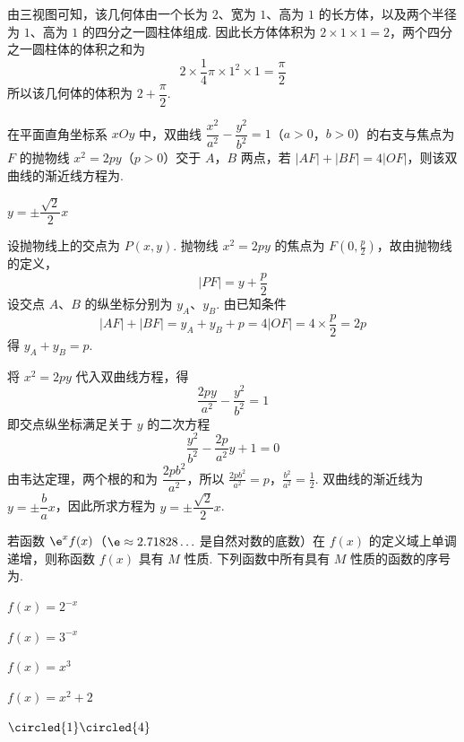 \begin{solution}
由三视图可知，该几何体由一个长为 \(2\)、宽为 \(1\)、高为 \(1\) 的长方体，以及两个半径为 \(1\)、高为 \(1\) 的四分之一圆柱体组成. 因此长方体体积为 \(2\times1\times1=2\)，两个四分之一圆柱体的体积之和为
\[
2\times\frac14\pi\times1^2\times1=\frac\pi2
\]
所以该几何体的体积为 \(2+\dfrac\pi2\).
\end{solution}

\begin{problem}
在平面直角坐标系 \(xOy\) 中，双曲线 \(\dfrac{x^2}{a^2}-\dfrac{y^2}{b^2}=1\)（\(a>0\)，\(b>0\)）的右支与焦点为 \(F\) 的抛物线 \(x^2=2py\)（\(p>0\)）交于 \(A\)，\(B\) 两点，若 \(\lvert AF\rvert+\lvert BF\rvert=4\lvert OF\rvert\)，则该双曲线的渐近线方程为\fillinblank{}.
\end{problem}

\begin{answer}
\(y=\pm\dfrac{\sqrt2}{2}x\)
\end{answer}

\begin{solution}
设抛物线上的交点为 \(P(x,y)\). 抛物线 \(x^2=2py\) 的焦点为 \(F(0,\frac p2)\)，故由抛物线的定义，
\[
|PF|=y+\frac p2
\]
设交点 \(A\)、\(B\) 的纵坐标分别为 \(y_A\)、\(y_B\). 由已知条件
\[
|AF|+|BF|=y_A+y_B+p=4|OF|=4\times\frac p2=2p
\]
得 \(y_A+y_B=p\).

将 \(x^2=2py\) 代入双曲线方程，得
\[
\frac{2py}{a^2}-\frac{y^2}{b^2}=1
\]
即交点纵坐标满足关于 \(y\) 的二次方程
\[
\frac{y^2}{b^2}-\frac{2p}{a^2}y+1=0
\]
由韦达定理，两个根的和为 \(\dfrac{2pb^2}{a^2}\)，所以
\(\frac{2pb^2}{a^2}=p\)，\(\frac{b^2}{a^2}=\frac12\).
双曲线的渐近线为 \(y=\pm\dfrac ba x\)，因此所求方程为 \(y=\pm\dfrac{\sqrt2}{2}x\).
\end{solution}

\begin{problem}
若函数 \(\e^x f(x)\)（\(\e\approx2.71828\ldots\) 是自然对数的底数）在 \(f(x)\) 的定义域上单调递增，则称函数 \(f(x)\) 具有 \(M\) 性质. 下列函数中所有具有 \(M\) 性质的函数的序号为\fillinblank{}.
\begin{circlelist}
\item \(f(x)=2^{-x}\)
\item \(f(x)=3^{-x}\)
\item \(f(x)=x^3\)
\item \(f(x)=x^2+2\)
\end{circlelist}
\end{problem}

\begin{answer}
\(\circled{1}\circled{4}\)
\end{answer}

